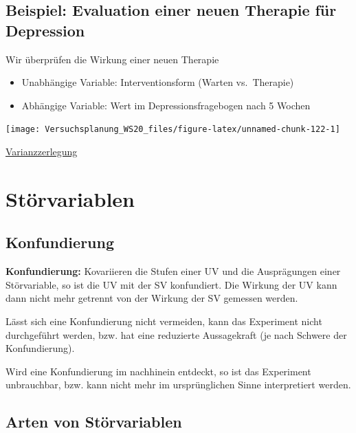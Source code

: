 \documentclass[
]{book}
\begin{document}
\hypertarget{beispiel-evaluation-einer-neuen-therapie-fuxfcr-depression}{%
\subsection{Beispiel: Evaluation einer neuen Therapie für Depression}\label{beispiel-evaluation-einer-neuen-therapie-fuxfcr-depression}}

Wir überprüfen die Wirkung einer neuen Therapie

\begin{itemize}
\item
  Unabhängige Variable: Interventionsform (Warten vs.~Therapie)
\item
  Abhängige Variable: Wert im Depressionsfragebogen nach 5 Wochen
\end{itemize}

\begin{center}\texttt{[image: Versuchsplanung\_WS20\_files/figure-latex/unnamed-chunk-122-1]} \end{center}

\href{https://mbrede.shinyapps.io/VPlanung/}{Varianzzerlegung}

\hypertarget{stuxf6rvariablen-1}{%
\section{Störvariablen}\label{stuxf6rvariablen-1}}

\hypertarget{konfundierung}{%
\subsection{Konfundierung}\label{konfundierung}}

\textbf{Konfundierung:} Kovariieren die Stufen einer UV und die Ausprägungen einer Störvariable, so
ist die UV mit der SV konfundiert. Die Wirkung der UV kann dann nicht mehr getrennt von der
Wirkung der SV gemessen werden.

Lässt sich eine Konfundierung nicht vermeiden, kann das Experiment nicht durchgeführt
werden, bzw. hat eine reduzierte Aussagekraft (je nach Schwere der Konfundierung).

Wird eine Konfundierung im nachhinein entdeckt, so ist das Experiment unbrauchbar, bzw.
kann nicht mehr im ursprünglichen Sinne interpretiert werden.

\hypertarget{arten-von-stuxf6rvariablen}{%
\subsection{Arten von Störvariablen}\label{arten-von-stuxf6rvariablen}}
\end{document}
